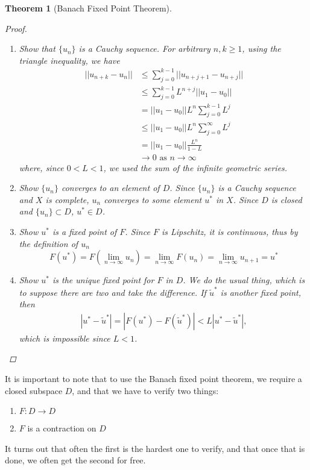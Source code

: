 \documentclass[12pt]{amsart}         %
\newtheorem{theorem}{Theorem}[section]
\theoremstyle{remark}
\begin{document}
\begin{theorem}[Banach Fixed Point Theorem]
\begin{proof}
\begin{enumerate}
	\item Show that $\{ u_n \}$ is a Cauchy sequence. For arbitrary $n, k \geq 1$, using the triangle inequality, we have
	\begin{align*}
	||u_{n+k} - u_n|| &\leq \sum_{j=0}^{k-1} || u_{n+j+1} - u_{n+j}|| \\
	&\leq \sum_{j=0}^{k-1} L^{n+j} ||u_1 - u_0|| \\
	&= ||u_1 - u_0|| L^n \sum_{j=0}^{k-1} L^j \\
	&\leq ||u_1 - u_0|| L^n \sum_{j=0}^{\infty} L^j \\
	&= ||u_1 - u_0|| \frac{L^n}{1 - L} \\
	&\rightarrow 0 \text{ as }n \rightarrow \infty
	\end{align*}
	where, since $0 < L < 1$, we used the sum of the infinite geometric series.
	
	\item Show $\{ u_n \}$ converges to an element of $D$. Since $\{ u_n \}$ is a Cauchy sequence and $X$ is complete, $u_n$ converges to some element $u^*$ in $X$. Since $D$ is closed and $\{u_n\} \subset D$, $u^* \in D$.
	
	\item Show $u^*$ is a fixed point of $F$. Since $F$ is Lipschitz, it is continuous, thus by the definition of $u_n$
	\[
	F(u^*) = F\left(\lim_{n\rightarrow \infty} u_n\right) = \lim_{n \rightarrow \infty} F(u_n) 
	= \lim_{n \rightarrow \infty} u_{n+1} = u^*
	\]

	\item Show $u^*$ is the unique fixed point for $F$ in $D$. We do the usual thing, which is to suppose there are two and take the difference. If $\tilde{u}^*$ is another fixed point, then
	\begin{align*}
	|u^* - \tilde{u}^*| = |F(u^*) - F(\tilde{u}^*)| < L|u^* - \tilde{u}^*|,
	\end{align*}
	which is impossible since $L < 1$.
\end{enumerate}
\end{proof}
\end{theorem}

It is important to note that to use the Banach fixed point theorem, we require a closed subspace $D$, and that we have to verify two things:
\begin{enumerate}
    \item $F: D \rightarrow D$
    \item $F$ is a contraction on $D$
\end{enumerate}
It turns out that often the first is the hardest one to verify, and that once that is done, we often get the second for free.
\end{document}

